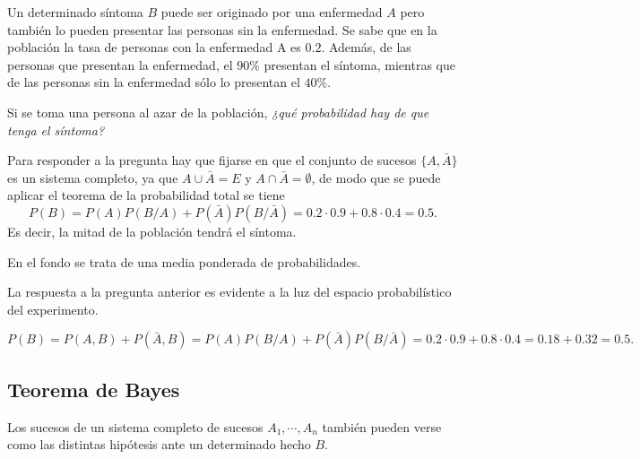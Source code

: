 \begin{ejemplo}
Un determinado síntoma $B$ puede ser originado por una enfermedad $A$ pero también lo pueden presentar las personas sin
la enfermedad. 
Se sabe que en la población la tasa de personas con la enfermedad A es $0.2$. 
Además, de las personas que presentan la enfermedad, el $90\%$ presentan el síntoma, mientras que de las personas sin la enfermedad sólo lo
presentan el $40\%$.

Si se toma una persona al azar de la población, \emph{¿qué probabilidad hay de que tenga el síntoma?}

Para responder a la pregunta hay que fijarse en que el conjunto de sucesos $\{A,\bar A\}$ es un sistema completo, ya que $A\cup
\bar A = E$ y $A\cap \bar A = \emptyset$, de modo que se puede aplicar el teorema de la probabilidad total se tiene
\[ P(B) = P(A)P(B/A)+P(\bar A)P(B/\bar A) = 0.2\cdot 0.9 + 0.8\cdot 0.4 = 0.5.\] 
Es decir, la mitad de la población tendrá el síntoma.

En el fondo se trata de una media ponderada de probabilidades. 

La respuesta a la pregunta anterior es evidente a la luz del espacio probabilístico del experimento. 
\begin{center}
\renewcommand{\psedge}[2]{\ncdiag[armA=0.8cm,angleA=180,angleB=0,armB=0cm]{#2}{#1}} 
\end{center}
\[
P(B) = P(A,B) + P(\bar A,B) = P(A)P(B/A)+P(\bar A)P(B/\bar A) = 0.2\cdot 0.9+ 0.8\cdot 0.4 = 0.18 + 0.32 = 0.5. 
\]
\end{ejemplo}


\subsection{Teorema de Bayes}
Los sucesos de un sistema completo de sucesos $A_1,\cdots,A_n$ también pueden verse como las distintas hipótesis ante un determinado hecho
$B$.

